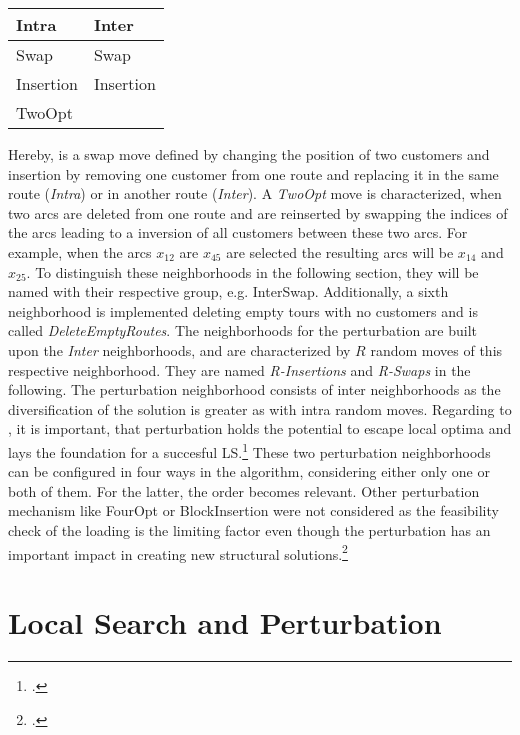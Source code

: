 \begin{table}[ht]
    \centering
    \begin{tabular}{@{}P{0.3\textwidth}P{0.3\textwidth}@{}}
        \toprule
        \textbf{Intra} & \textbf{Inter} \\
        \midrule
        Swap           & Swap           \\
        Insertion      & Insertion      \\
        TwoOpt         &                \\
        \bottomrule
    \end{tabular}
\end{table}
Hereby, is a swap move defined by changing the position of two customers and insertion by removing one customer from one route
and replacing it in the same route (\textit{Intra}) or in another route (\textit{Inter}). A \textit{TwoOpt} move is characterized, when two arcs are deleted
from one route and are reinserted by swapping the indices of the arcs leading to a inversion of all customers between these two arcs.
For example, when the arcs $x_{12}$ are $x_{45}$ are selected the resulting arcs will be $x_{14}$ and $x_{25}$. To distinguish these
neighborhoods in the following section, they will be named with their respective group, e.g. InterSwap. Additionally, a sixth
neighborhood is implemented deleting empty tours with no customers and is called \textit{DeleteEmptyRoutes}.
The neighborhoods for the perturbation are built upon the \textit{Inter} neighborhoods, and are characterized by $R$ random moves of
this respective neighborhood. They are named \textit{R-Insertions} and \textit{R-Swaps} in the
following. The perturbation neighborhood consists of inter neighborhoods as the diversification of the solution is
greater as with intra random moves. Regarding to \cite{lourenco_iterated_2003}, it is important, that perturbation holds the potential
to escape local optima and lays the foundation for a succesful \gls{LS}.\footcite[cf.][pp. 329f.]{lourenco_iterated_2003} These two perturbation neighborhoods
can be configured in four ways in the algorithm, considering either only one or both of them. For the latter, the order becomes relevant.
Other perturbation mechanism like FourOpt or BlockInsertion were not considered as the feasibility check of the loading is the limiting factor even though
the perturbation has an important impact in creating new structural solutions.\footcite[cf.][pp. 329-332]{lourenco_iterated_2003}

\section{Local Search and Perturbation}
\label{sec:LSandPerturbation}

